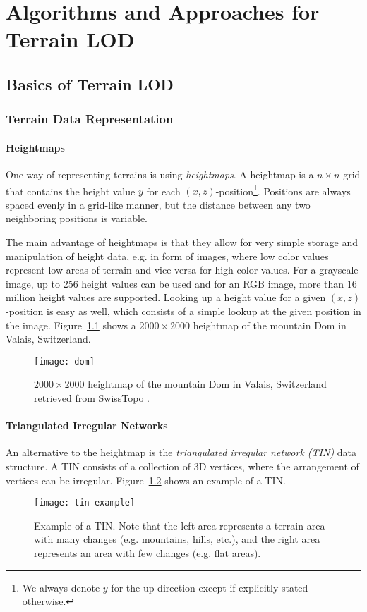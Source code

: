 \chapter{Algorithms and Approaches for Terrain LOD}
\section{Basics of Terrain LOD}
\subsection{Terrain Data Representation}
\subsubsection{Heightmaps}
One way of representing terrains is using \textit{heightmaps}.
A heightmap is a $n\times n$-grid that contains 
the height value $y$ for each $(x,z)$-position\footnote{We always denote $y$ for the up direction except if explicitly stated otherwise.}.
Positions are always spaced evenly in a grid-like manner,
but the distance between any two neighboring positions is variable.

The main advantage of heightmaps is that they allow for very simple storage and manipulation of height data, e.g. in form of images,
where low color values represent low areas of terrain and vice versa for
high color values. For a grayscale image, up to 256 height values can be used and for an RGB image,
more than 16 million height values are supported.
Looking up a height value for a given $(x,z)$-position is easy as well,
which consists of a simple lookup at the given position in the image.
Figure~\ref{fig:dom} shows a $2000 \times 2000$ heightmap of the mountain Dom in Valais, Switzerland.
\begin{figure}[H]
  \centering
  \texttt{[image: dom]}
  \caption{$2000 \times 2000$ heightmap of the mountain Dom in Valais, Switzerland retrieved from SwissTopo \cite{alti3d}.}\label{fig:dom}
\end{figure}

\subsubsection{Triangulated Irregular Networks}
An alternative to the heightmap is the \textit{triangulated irregular network (TIN)} data structure.
A TIN consists of a collection of 3D vertices, where 
the arrangement of vertices can be irregular. Figure~\ref{fig:tin-example} shows 
an example of a TIN.
\begin{figure}[H]
  \centering
  \texttt{[image: tin-example]}
  \caption{Example of a TIN. Note that the left area represents a terrain area with many changes 
  (e.g. mountains, hills, etc.), and the right area represents an area with few changes (e.g. flat areas).}\label{fig:tin-example}
\end{figure}

